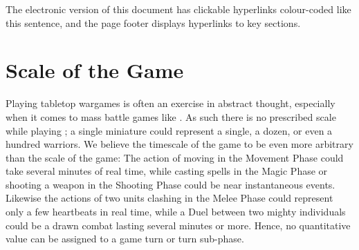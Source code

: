 \begin{hidewhenprinted}\textcolor{linkcolour}{The electronic version of this document has clickable hyperlinks colour-coded like this sentence, and the page footer displays hyperlinks to key sections.}\end{hidewhenprinted}


\begin{center}
\begin{framed}
\license
\end{framed}
\end{center}

\noindent \latexcredit

\section{Scale of the Game}

Playing tabletop wargames is often an exercise in abstract thought, especially when it comes to mass battle games like \theninthage{}. As such there is no prescribed scale while playing \theninthage{}; a single miniature could represent a single, a dozen, or even a hundred warriors. We believe the timescale of the game to be even more arbitrary than the scale of the game: The action of moving in the Movement Phase could take several minutes of real time, while casting spells in the Magic Phase or shooting a weapon in the Shooting Phase could be near instantaneous events. Likewise the actions of two units clashing in the Melee Phase could represent only a few heartbeats in real time, while a Duel between two mighty individuals could be a drawn combat lasting several minutes or more. Hence, no quantitative value can be assigned to a game turn or turn sub-phase.
